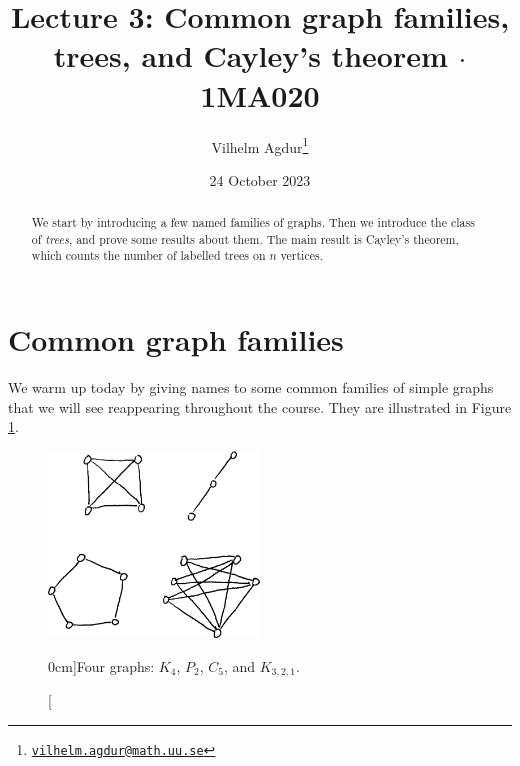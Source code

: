 \documentclass[nobib]{tufte-handout}
\title{Lecture 3: Common graph families, trees, and Cayley's theorem $\cdot$ 1MA020}
\author[Vilhelm Agdur]{Vilhelm Agdur\thanks{\href{mailto:vilhelm.agdur@math.uu.se}{\nolinkurl{vilhelm.agdur@math.uu.se}}}}
\date{24 October 2023}
\begin{document}
\maketitle%

\begin{abstract}
\noindent
We start by introducing a few named families of graphs. Then we introduce the class of \emph{trees}, and prove some results about them. The main result is Cayley's theorem, which counts the number of labelled trees on $n$ vertices.
\end{abstract}

\section{Common graph families}

We warm up today by giving names to some common families of simple graphs that we will see reappearing throughout the course. They are illustrated in Figure \ref{fig:graph_families}.

\begin{figure}
  \centering
  \includegraphics[width=0.5\textwidth]{graphics/L3_trees/graph_families.png}
  \caption[][0cm]{Four graphs: $K_4$, $P_2$, $C_5$, and $K_{3,2,1}$.}
  \label{fig:graph_families}
\end{figure}
\end{document}
